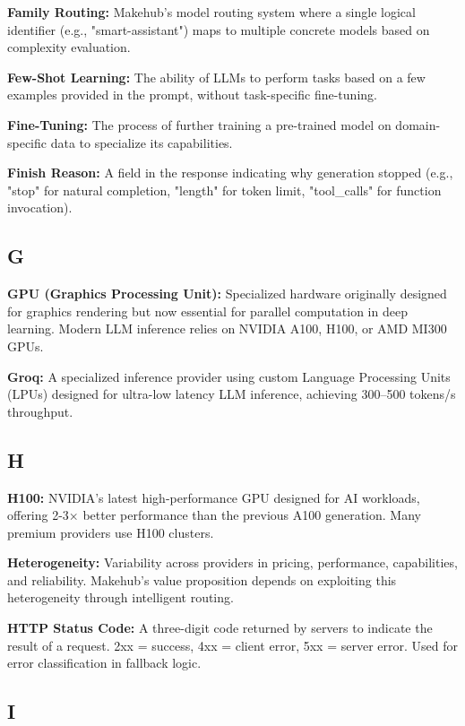 \documentclass[english]{article}
\begin{document}
\textbf{Family Routing:} Makehub's model routing system where a single logical identifier (e.g., "smart-assistant") maps to multiple concrete models based on complexity evaluation.

\textbf{Few-Shot Learning:} The ability of LLMs to perform tasks based on a few examples provided in the prompt, without task-specific fine-tuning.

\textbf{Fine-Tuning:} The process of further training a pre-trained model on domain-specific data to specialize its capabilities.

\textbf{Finish Reason:} A field in the response indicating why generation stopped (e.g., "stop" for natural completion, "length" for token limit, "tool\_calls" for function invocation).

\subsection*{G}

\textbf{GPU (Graphics Processing Unit):} Specialized hardware originally designed for graphics rendering but now essential for parallel computation in deep learning. Modern LLM inference relies on NVIDIA A100, H100, or AMD MI300 GPUs.

\textbf{Groq:} A specialized inference provider using custom Language Processing Units (LPUs) designed for ultra-low latency LLM inference, achieving 300--500 tokens/s throughput.

\subsection*{H}

\textbf{H100:} NVIDIA's latest high-performance GPU designed for AI workloads, offering 2-3× better performance than the previous A100 generation. Many premium providers use H100 clusters.

\textbf{Heterogeneity:} Variability across providers in pricing, performance, capabilities, and reliability. Makehub's value proposition depends on exploiting this heterogeneity through intelligent routing.

\textbf{HTTP Status Code:} A three-digit code returned by servers to indicate the result of a request. 2xx = success, 4xx = client error, 5xx = server error. Used for error classification in fallback logic.

\subsection*{I}
\end{document}
